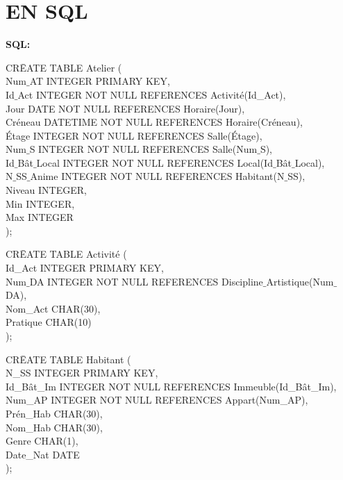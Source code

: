 \documentclass[a4paper,10.5pt]{report}
\begin{document}
	\section*{EN SQL}
	\textbf{SQL\@: }
		\begin{tabbing}
			CR\=EATE TABLE Atelier (\\
			\> Num$\_$AT INTEGER PRIMARY KEY,\\
			\> Id$\_$Act INTEGER NOT NULL REFERENCES Activité(Id\_Act),\\
			\> Jour DATE NOT NULL REFERENCES Horaire(Jour),\\
			\> Créneau DATETIME NOT NULL REFERENCES Horaire(Créneau),\\
			\> Étage INTEGER NOT NULL REFERENCES Salle(Étage),\\
			\> Num$\_$S INTEGER NOT NULL REFERENCES Salle(Num$\_$S),\\
			\> Id$\_$Bât$\_$Local INTEGER NOT NULL REFERENCES Local(Id$\_$Bât$\_$Local),\\
			\> N$\_$SS$\_$Anime  INTEGER NOT NULL REFERENCES Habitant(N$\_$SS),\\
			\> Niveau INTEGER,\\
			\> Min INTEGER,\\
			\> Max INTEGER\\);
		\end{tabbing}

		\begin{tabbing}
			CR\=EATE TABLE Activité (\\
			\> Id\_Act INTEGER PRIMARY KEY,\\
			\> Num$\_$DA INTEGER NOT NULL REFERENCES Discipline$\_$Artistique(Num$\_$DA),\\
			\> Nom\_Act CHAR(30),\\
			\> Pratique CHAR(10)\\);
		\end{tabbing}

		\begin{tabbing}
			CR\=EATE TABLE Habitant (\\
			\> N\_SS INTEGER PRIMARY KEY,\\
			\> Id\_Bât\_Im INTEGER NOT NULL REFERENCES Immeuble(Id\_Bât\_Im),\\
			\> Num\_AP INTEGER NOT NULL REFERENCES Appart(Num\_AP),\\
			\> Prén\_Hab CHAR(30),\\
			\> Nom\_Hab CHAR(30),\\
			\> Genre CHAR(1),\\
			\> Date\_Nat DATE\\);
		\end{tabbing}
\end{document}
